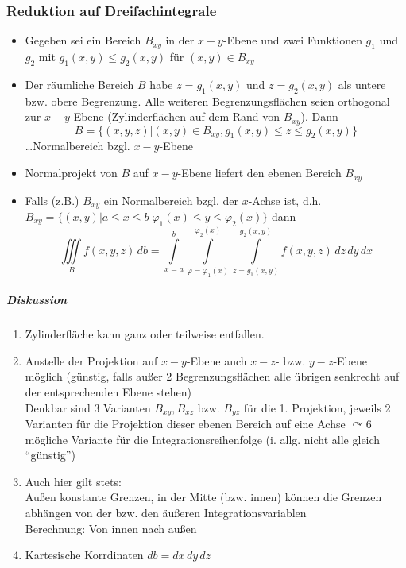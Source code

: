 \documentclass[a4paper]{scrartcl}
\begin{document}
\subsubsection{Reduktion auf Dreifachintegrale}
\begin{itemize}
\item Gegeben sei ein Bereich $B_{xy}$ in der $x-y$-Ebene und zwei Funktionen $g_1$ und $g_2$ mit $g_1(x,y) \leq g_2(x,y)$ für $(x,y) \in B_{xy}$
\item Der räumliche Bereich $B$ habe $z=g_1(x,y)$ und $z=g_2(x,y)$ als untere bzw. obere Begrenzung. Alle weiteren Begrenzungsflächen seien orthogonal zur $x-y$-Ebene (Zylinderflächen auf dem Rand von $B_{xy}$). Dann
\[ B = \{ (x,y,z) | (x,y) \in B_{xy}, g_1(x,y) \leq z \leq g_2(x,y) \} \] \dots Normalbereich bzgl. $x-y$-Ebene
\item Normalprojekt von $B$ auf $x-y$-Ebene liefert den ebenen Bereich $B_{xy}$
\item Falls (z.B.) $B_{xy}$ ein Normalbereich bzgl. der $x$-Achse ist, d.h. $B_{xy} = \{ (x,y) | a \leq x \leq b \; \varphi_1 (x) \leq y \leq \varphi_2(x)\}$ dann
\[ \iiint\limits_B  f(x,y,z) \, db = \int\limits_{x=a}^b \int\limits_{\varphi = \varphi_1 (x)}^{\varphi_2 (x)} \int\limits_{z=g_1(x,y)}^{g_2(x,y)} f(x,y,z) \, dz \, dy \, dx\]
\end{itemize}
\subparagraph{Diskussion}
\begin{enumerate}
\item Zylinderfläche kann ganz oder teilweise entfallen.
\item Anstelle der Projektion auf $x-y$-Ebene auch $x-z$- bzw. $y-z$-Ebene möglich (günstig, falls außer 2 Begrenzungsflächen alle übrigen senkrecht auf der entsprechenden Ebene stehen)\\
Denkbar sind 3 Varianten $B_{xy},B_{xz}$ bzw. $B_{yz}$ für die 1. Projektion, jeweils 2 Varianten für die Projektion dieser ebenen Bereich auf eine Achse $\curvearrowright 6$ mögliche Variante für die Integrationsreihenfolge (i. allg. nicht alle gleich "`günstig"') 
\item Auch hier gilt stets:\\
Außen konstante Grenzen, in der Mitte (bzw. innen) können die Grenzen abhängen von der bzw. den äußeren Integrationsvariablen\\
Berechnung: Von innen nach außen
\item Kartesische Korrdinaten $db = dx \, dy \, dz$
\end{enumerate}
\end{document}
